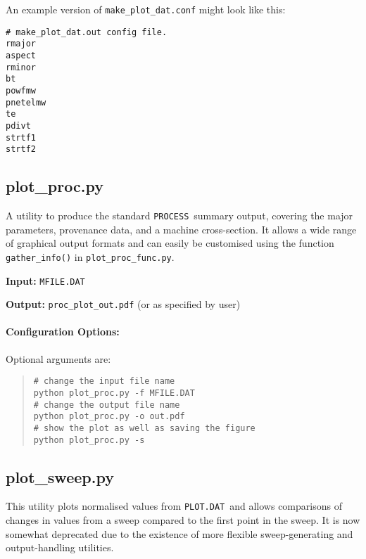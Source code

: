\documentclass[11pt,a4paper]{report}
\newcommand{\mfile}{\mbox{\texttt{MFILE.DAT}}}
\newcommand{\plotdat}{\mbox{\texttt{PLOT.DAT}}}
\newcommand{\process}{\mbox{\texttt{PROCESS}}}
\begin{document}
An example version of \texttt{make\_plot\_dat.conf} might look like this:
\begin{framed}
\begin{verbatim}
# make_plot_dat.out config file.
rmajor
aspect
rminor
bt
powfmw
pnetelmw
te
pdivt
strtf1
strtf2
\end{verbatim}
\end{framed}

\subsection{plot\_proc.py}

A utility to produce the standard \process\ summary output, covering the major
parameters, provenance data, and a machine cross-section. It allows a wide
range of graphical output formats and can easily be customised using the
function \texttt{gather\_info()} in \texttt{plot\_proc\_func.py}.

\begin{description}
\item{\textbf{Input:}}
 \mfile
                                
\item{\textbf{Output:}}
\verb|proc_plot_out.pdf| (or as specified by user)
\end{description}

\paragraph{Configuration Options:}

Optional arguments are:
\begin{quote}
\begin{verbatim}
# change the input file name
python plot_proc.py -f MFILE.DAT 
# change the output file name
python plot_proc.py -o out.pdf
# show the plot as well as saving the figure
python plot_proc.py -s 
\end{verbatim}
\end{quote}

\subsection{plot\_sweep.py}

This utility plots normalised values from \plotdat\ and allows comparisons of
changes in values from a sweep compared to the first point in the sweep. It is
now somewhat deprecated due to the existence of more flexible sweep-generating
and output-handling utilities.
\end{document}
